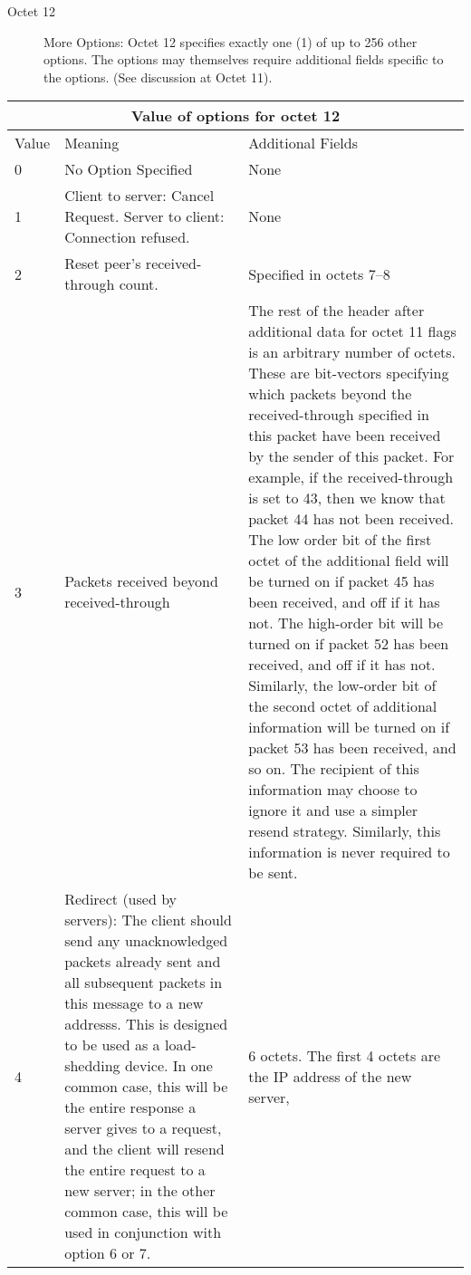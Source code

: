 \begin{description}
\item[Octet 12] More Options:  Octet 12 specifies exactly one (1)
of up to 256 other options.  The options may themselves require additional
fields specific to the options.  (See discussion at Octet 11).  
\end{description}

\begin{center}
\begin{tabular}{|l|p{3.0in}|p{3.0in}|}
\multicolumn{3}{c}{Value of options for octet 12} \\ \hline
Value   & Meaning       & Additional Fields \\ \hline
0       & No Option Specified & None            \\ \hline
1       & Client to server: Cancel Request.  Server to client:
Connection refused. & None                 \\ \hline
2       & Reset peer's received-through count. 
	& Specified in octets 7--8 \\ \hline
3       & Packets received beyond received-through
	  & The rest of the	
header after additional data for octet 11 flags is an arbitrary
number of octets.  These are bit-vectors specifying which packets
beyond the received-through specified in this packet have been
received by the sender of this packet.  For example, if the
received-through is set to 43, then we know that packet 44 has not
been received.  The low order bit of the first octet of the additional
field will be turned on if packet 45 has been received, and off if it
has not.  The high-order bit will be turned on if packet 52 has been
received, and off if it has not.  Similarly, the low-order bit of the
second octet of additional information will be turned on if packet 53
has been received, and so on.  The recipient of this information may
choose to ignore it and use a simpler resend strategy.  Similarly,
this information is never required to be sent. \\ \hline
4       & Redirect (used by servers): The client should send any
unacknowledged packets 
already sent and all subsequent packets in this message to a new
addresss.  This is designed to be used as a load-shedding device.  In
one common case, this will be the entire response a server gives to a request,
and the client will resend the entire request to a new server; in
the other common case, this will be used in conjunction with option 6
or 7.
	& 6 octets.  The first 4 octets are the IP address of the new server,

\end{tabular}
\end{center}
